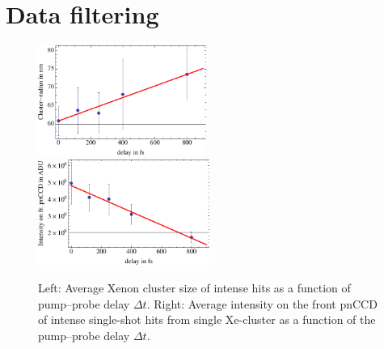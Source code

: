 \section{Data filtering}\label{sec:hitfinding}
\begin{figure}
	\centering
		\includegraphics[width=0.49\textwidth]{images/filter-size.pdf}
		\includegraphics[width=0.50\textwidth]{images/filter-sum-frontpnCCD.pdf}
	\caption[Average cluster size correlated to measured intensity on front pnCCD.]{Left: Average Xenon cluster size of intense hits as a function of pump--probe delay $\Delta t$. Right: Average intensity on the front pnCCD of intense single-shot hits from single Xe-cluster as a function of the pump--probe delay $\Delta t$.}
	\label{fig:filter-size-intensity}
\end{figure}
